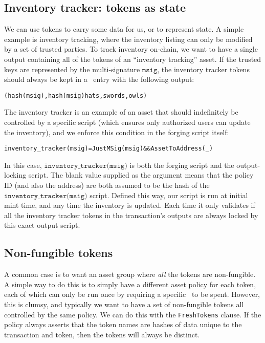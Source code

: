 \subsection{Inventory tracker: tokens as state}

We can use tokens to carry some data for us, or to represent state.
A simple example is inventory tracking, where the inventory listing can only be modified by a set of trusted parties.
To track inventory on-chain, we want to have a single output containing all of the tokens of an ``inventory tracking'' asset.
If the trusted keys are represented by the multi-signature $\texttt{msig}$, the inventory tracker tokens should always be kept in a \UTXO\ entry with the following output:
\begin{alltt}
  (hash(msig) , \cL{}hash(msig) \mapsTo \cL{}hats , swords , owls \cR\cR)
\end{alltt}

The inventory tracker is
an example of an asset that should indefinitely be controlled by a specific script
(which ensures only authorized users can update the inventory), and
we enforce this condition in the forging script itself:

\begin{alltt}
  inventory_tracker(msig) = JustMSig(msig) && AssetToAddress(_)
\end{alltt}

In this case, $\texttt{inventory\_tracker(msig)}$ is both the forging
script and the output-locking script. The blank value supplied as the
argument means that the policy ID (and also the address) are both
assumed to be the hash of the $\texttt{inventory\_tracker(msig)}$
script.
Defined this way, our script is run at initial mint time, and any time
the inventory is updated. Each time
it only validates if all the inventory tracker tokens in the transaction's
outputs are always locked by this exact output script.

\subsection{Non-fungible tokens}

A common case is to want an asset group where \emph{all} the tokens are non-fungible.
A simple way to do this is to simply have a different asset policy for each token, each of which can only be run once by requiring a specific \UTXO\ to be spent. However, this is clumsy, and typically we want to have a set of non-fungible tokens all controlled by the same policy. We can do this with the \texttt{FreshTokens} clause.
If the policy always asserts that the token names are hashes of data unique to the transaction and token, then the tokens will always be distinct.

